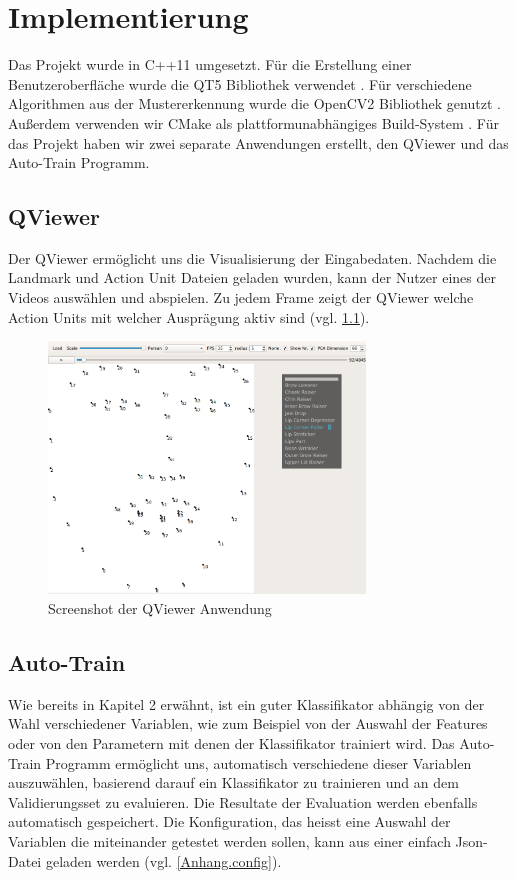 \chapter{Implementierung}\label{ch:implementierung}
Das Projekt wurde in C++11 umgesetzt. Für die Erstellung einer Benutzeroberfläche wurde die QT5 Bibliothek verwendet \cite{qt5}.
Für verschiedene Algorithmen aus der Mustererkennung wurde die OpenCV2 Bibliothek genutzt \cite{opencv}. Außerdem verwenden wir CMake
als plattformunabhängiges Build-System \cite{cmake}. Für das Projekt haben wir zwei separate Anwendungen erstellt, den QViewer und das Auto-Train
Programm.

\section{QViewer}
Der QViewer ermöglicht uns die Visualisierung der Eingabedaten. Nachdem die Landmark und Action Unit Dateien geladen wurden,
kann der Nutzer eines der Videos auswählen und abspielen. Zu jedem Frame zeigt
der QViewer welche Action Units mit welcher Ausprägung aktiv sind (vgl. \cref{Implementierung.QViewer}).

\begin{figure}
\begin{center}
\includegraphics[width=0.75\textwidth]{qviewer.png}
\caption{Screenshot der QViewer Anwendung}
\end{center}
\label{Implementierung.QViewer}
\end{figure}


\section{Auto-Train}
Wie bereits in Kapitel 2 erwähnt, ist ein guter Klassifikator abhängig von der Wahl verschiedener Variablen, wie zum Beispiel
von der Auswahl der Features oder von den Parametern mit denen der Klassifikator trainiert wird.
Das Auto-Train Programm ermöglicht uns, automatisch verschiedene dieser Variablen auszuwählen, basierend darauf ein Klassifikator
zu trainieren und an dem Validierungsset zu evaluieren. Die Resultate der Evaluation werden ebenfalls automatisch gespeichert.
Die Konfiguration, das heisst eine Auswahl der Variablen die miteinander getestet werden sollen, kann aus einer einfach Json-Datei
geladen werden (vgl. \ref{Anhang.config}).

